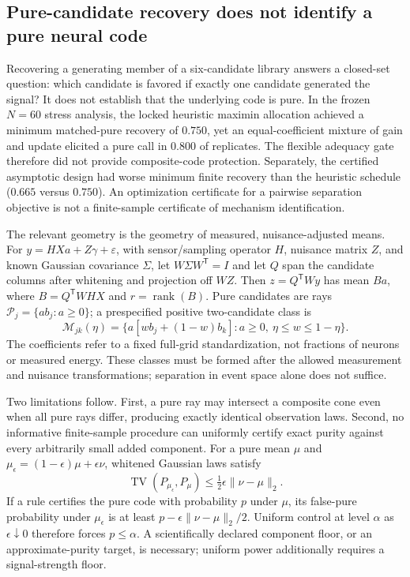 \subsection{Pure-candidate recovery does not identify a pure neural code}
\label{sec:composite-identification}

Recovering a generating member of a six-candidate library answers a closed-set
question: which candidate is favored if exactly one candidate generated the
signal? It does not establish that the underlying code is pure. In the frozen
$N=60$ stress analysis, the locked heuristic maximin allocation achieved a
minimum matched-pure recovery of $0.750$, yet an equal-coefficient mixture of
gain and update elicited a pure call in $0.800$ of replicates. The flexible
adequacy gate therefore did not provide composite-code protection. Separately,
the certified asymptotic design had worse minimum finite recovery than the
heuristic schedule ($0.665$ versus $0.750$). An optimization certificate for a
pairwise separation objective is not a finite-sample certificate of mechanism
identification.

The relevant geometry is the geometry of measured, nuisance-adjusted means.
For $y=HXa+Z\gamma+\varepsilon$, with sensor/sampling operator $H$, nuisance
matrix $Z$, and known Gaussian covariance $\Sigma$, let $W\Sigma W^{\mathsf T}=I$
and let $Q$ span the candidate columns after whitening and projection off $WZ$.
Then $z=Q^{\mathsf T}Wy$ has mean $Ba$, where $B=Q^{\mathsf T}WHX$ and
$r=\operatorname{rank}(B)$. Pure candidates are rays
$\mathcal P_j=\{a b_j:a\geq0\}$; a prespecified positive two-candidate class is
\begin{equation}
 \mathcal M_{jk}(\eta)=
 \{a[w b_j+(1-w)b_k]:a\geq0,\ \eta\leq w\leq1-\eta\}.
 \label{eq:bounded-composite-family}
\end{equation}
The coefficients refer to a fixed full-grid standardization, not fractions of
neurons or measured energy. These classes must be formed after the allowed
measurement and nuisance transformations; separation in event space alone
does not suffice.

Two limitations follow. First, a pure ray may intersect a composite cone even
when all pure rays differ, producing exactly identical observation laws.
Second, no informative finite-sample procedure can uniformly certify exact
purity against every arbitrarily small added component. For a pure mean $\mu$
and $\mu_\epsilon=(1-\epsilon)\mu+\epsilon\nu$, whitened Gaussian laws satisfy
\begin{equation}
 \operatorname{TV}(P_{\mu_\epsilon},P_\mu)
 \leq \tfrac12\epsilon\|\nu-\mu\|_2.
\end{equation}
If a rule certifies the pure code with probability $p$ under $\mu$, its
false-pure probability under $\mu_\epsilon$ is at least
$p-\epsilon\|\nu-\mu\|_2/2$. Uniform control at level $\alpha$ as
$\epsilon\downarrow0$ therefore forces $p\leq\alpha$. A scientifically
declared component floor, or an approximate-purity target, is necessary;
uniform power additionally requires a signal-strength floor.

